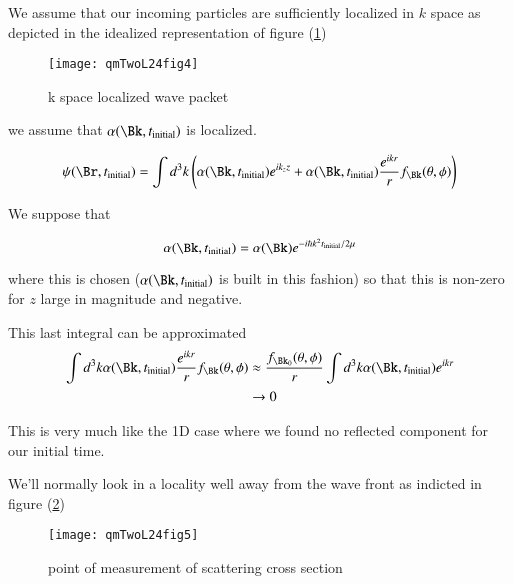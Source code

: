 We assume that our incoming particles are sufficiently localized in $k$ space as depicted in the idealized representation of figure (\ref{fig:qmTwoL24:qmTwoL24fig4})

\begin{figure}[htp]
   \centering
   \texttt{[image: qmTwoL24fig4]}
   \caption{k space localized wave packet}\label{fig:qmTwoL24:qmTwoL24fig4}
\end{figure}

we assume that $\alpha(\Bk, t_{\text{initial}})$ is localized.

\begin{equation}\label{eqn:qmTwoL24:150}
\psi(\Br, t_{\text{initial}}) =
\int d^3k
\left(
\alpha(\Bk, t_{\text{initial}})
e^{i k_z z}
+
\alpha(\Bk, t_{\text{initial}}) \frac{e^{i k r}}{r} f_\Bk(\theta, \phi)
\right)
\end{equation}

We suppose that

\begin{equation}\label{eqn:qmTwoL24:170}
\alpha(\Bk, t_{\text{initial}}) = \alpha(\Bk) e^{-i \hbar k^2 t_{\text{initial}}/ 2\mu}
\end{equation}

where this is chosen ($\alpha(\Bk, t_{\text{initial}})$ is built in this fashion) so that this is non-zero for $z$ large in magnitude and negative.

This last integral can be approximated
\begin{equation}\label{eqn:qmTwoL24:190}
\begin{aligned}
\int d^3k
\alpha(\Bk, t_{\text{initial}}) \frac{e^{i k r}}{r} f_\Bk(\theta, \phi)
&\approx
\frac{f_{\Bk_0}(\theta, \phi)}{r}
\int d^3k
\alpha(\Bk, t_{\text{initial}}) e^{i k r} \\
&\rightarrow 0
\end{aligned}
\end{equation}

This is very much like the 1D case where we found no reflected component for our initial time.

We'll normally look in a locality well away from the wave front as indicted in figure (\ref{fig:qmTwoL24:qmTwoL24fig5})

\begin{figure}[htp]
   \centering
   \texttt{[image: qmTwoL24fig5]}
   \caption{point of measurement of scattering cross section}\label{fig:qmTwoL24:qmTwoL24fig5}
\end{figure}

